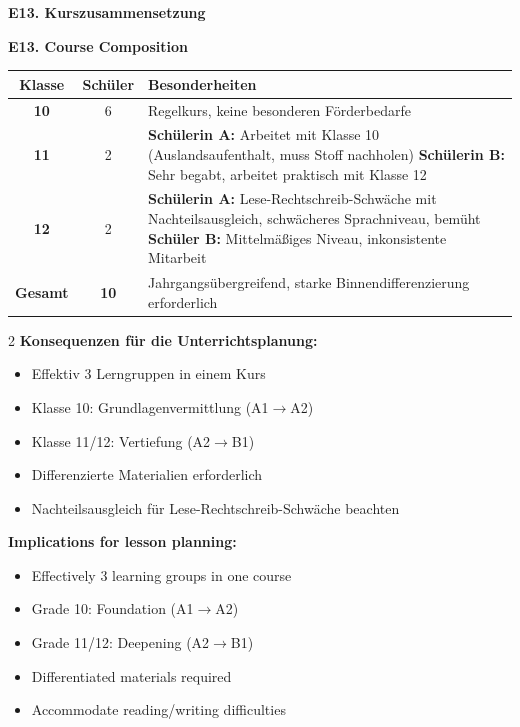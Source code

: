 \documentclass[10pt,a4paper]{article}
\newcommand{\secbil}[2]{%
\vspace{6pt}
\noindent\colorbox{spaet}{\parbox{0.48\textwidth}{\color{white}\bfseries\small #1}}%
\hfill%
\colorbox{english}{\parbox{0.48\textwidth}{\color{white}\bfseries\small #2}}
\vspace{3pt}
}
\begin{document}
\newpage

\secbil{E13. Kurszusammensetzung}{E13. Course Composition}

\vspace{2mm}

\begin{center}
\small
\begin{tabular}{|c|c|p{10cm}|}
\hline
\rowcolor{lightgray}
\textbf{Klasse} & \textbf{Schüler} & \textbf{Besonderheiten} \\
\hline
\textbf{10} & 6 & Regelkurs, keine besonderen Förderbedarfe \\
\hline
\textbf{11} & 2 & \textbf{Schülerin A:} Arbeitet mit Klasse 10 (Auslandsaufenthalt, muss Stoff nachholen) \newline \textbf{Schülerin B:} Sehr begabt, arbeitet praktisch mit Klasse 12 \\
\hline
\textbf{12} & 2 & \textbf{Schülerin A:} Lese-Rechtschreib-Schwäche mit Nachteilsausgleich, schwächeres Sprachniveau, bemüht \newline \textbf{Schüler B:} Mittelmäßiges Niveau, inkonsistente Mitarbeit \\
\hline
\rowcolor{lightspaet}
\textbf{Gesamt} & \textbf{10} & Jahrgangsübergreifend, starke Binnendifferenzierung erforderlich \\
\hline
\end{tabular}
\end{center}

\vspace{2mm}

\begin{paracol}{2}
\scriptsize
\textbf{Konsequenzen für die Unterrichtsplanung:}
\begin{itemize}[noitemsep,topsep=2pt]
\item Effektiv 3 Lerngruppen in einem Kurs
\item Klasse 10: Grundlagenvermittlung (A1$\rightarrow$A2)
\item Klasse 11/12: Vertiefung (A2$\rightarrow$B1)
\item Differenzierte Materialien erforderlich
\item Nachteilsausgleich für Lese-Rechtschreib-Schwäche beachten
\end{itemize}

\switchcolumn

\scriptsize\color{english}
\textbf{Implications for lesson planning:}
\begin{itemize}[noitemsep,topsep=2pt]
\item Effectively 3 learning groups in one course
\item Grade 10: Foundation (A1$\rightarrow$A2)
\item Grade 11/12: Deepening (A2$\rightarrow$B1)
\item Differentiated materials required
\item Accommodate reading/writing difficulties
\end{itemize}

\end{paracol}
\end{document}
